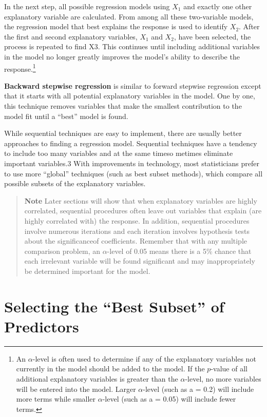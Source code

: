 \documentclass[
]{report}
\begin{document}
In the next step, all possible regression models using \(X_1\) and exactly one other explanatory variable are calculated. From among all these two-variable models, the regression model that best explains the response is used to identify \(X_2\). After the first and second explanatory variables, \(X_1\) and \(X_2\), have been selected, the process is repeated to find X3. This continues until including additional variables in the model no longer
greatly improves the model's ability to describe the response.\footnote{An \(\alpha\)-level is often used to determine if any of the explanatory variables not currently in the model should be added to the model. If the \(p\)-value of all additional explanatory variables is greater than the \(\alpha\)-level, no more variables will be entered into the model. Larger \(\alpha\)-level (such as a = 0.2) will include more terms while smaller \(\alpha\)-level (such as a = 0.05) will include fewer terms.}

\textbf{Backward stepwise regression} is similar to forward stepwise regression except that it starts with all potential explanatory variables in the model. One by one, this technique removes variables that make the smallest contribution to the model fit until a ``best'' model is found.

While sequential techniques are easy to implement, there are usually better approaches to finding a regression model. Sequential techniques have a tendency to include too many variables and at the same timeso metimes eliminate important variables.3 With improvements in technology, most statisticians prefer to use more ``global'' techniques (such as best subset methods), which compare all possible subsets of the explanatory variables.

\begin{quote}
\textbf{Note} Later sections will show that when explanatory variables are highly correlated, sequential procedures often leave out variables that explain (are highly correlated with) the response. In addition, sequential procedures involve numerous iterations and each iteration involves hypothesis tests about the significanceof coefficients. Remember that with any multiple comparison problem, an \(\alpha\)-level of 0.05 means there is a 5\% chance that each irrelevant variable will be found significant and may inappropriately be determined important for the model.
\end{quote}

\hypertarget{selecting-the-best-subset-of-predictors}{%
\section*{Selecting the ``Best Subset'' of Predictors}\label{selecting-the-best-subset-of-predictors}}
\end{document}
